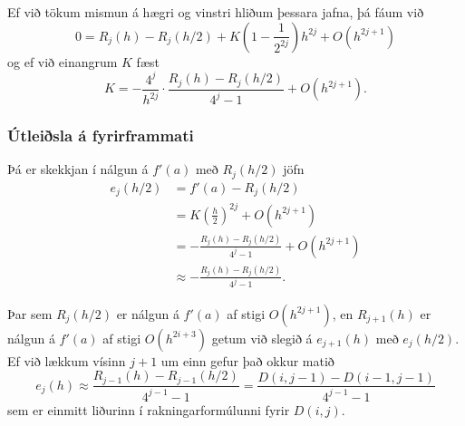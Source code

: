 \documentclass[icelandic,a4paper,12pt]{article}
\begin{document}
\pause
\smallskip
Ef við tökum mismun á hægri og vinstri hliðum þessara jafna, þá fáum
við 
\begin{equation*}
  0 = R_j(h) - R_j(h/2) + K \left(1 - \frac{1}{2^{2j}}\right)h^{2j}
  + O(h^{2j+1})
\end{equation*}
og ef við einangrum $K$ fæst
$$
  K = -\frac{4^{j}}{h^{2j}} \cdot \frac{R_j(h)-R_j(h/2)}{4^{j}-1} +
O(h^{2j+1}).
$$



\subsubsection{Útleiðsla á fyrirframmati} 
Þá er skekkjan í nálgun á $f'(a)$ með $R_j(h/2)$ jöfn
\begin{align*}
  e_j(h/2) &= f'(a) - R_j(h/2) \\
  &= K\left(\frac{h}{2}\right)^{2j} + O(h^{2j+1}) \\
  &= -\frac{R_j(h)-R_j(h/2)}{4^{j}-1} + O(h^{2j+1}) \\
  &\approx -\frac{R_j(h)-R_j(h/2)}{4^{j}-1}.
\end{align*}

\pause
Þar sem $R_j(h/2)$ er nálgun á $f'(a)$ af stigi $O(h^{2j+1})$, en
$R_{j+1}(h)$ er nálgun á $f'(a)$ af stigi $O(h^{2i+3})$ getum við
slegið á $e_{j+1}(h)$ með $e_j(h/2)$. Ef við lækkum vísinn $j+1$ um
einn gefur það okkur matið 
\begin{equation*}
  e_j(h) \approx \frac{R_{j-1}(h)-R_{j-1}(h/2)}{4^{j-1}-1} =
  \frac{D(i,j-1)-D(i-1,j-1)}{4^{j-1}-1}
\end{equation*}
sem er einmitt liðurinn í rakningarformúlunni fyrir $D(i,j)$. 



% 
% 
% 
% 
\end{document}
